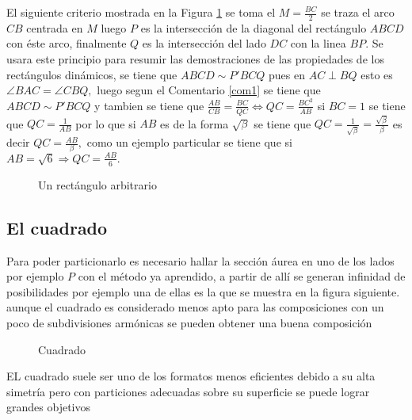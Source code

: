 \begin{comen}

	El siguiente criterio mostrada en la Figura \ref{Upu} se toma el $M=\frac{BC}{2}$ se traza el arco $CB$ centrada en $M$ luego $P$ es la intersección de la diagonal del rectángulo $ABCD$ con éste arco, finalmente $Q$ es la intersección del lado $DC$ con la linea $BP$. Se usara este principio para resumir las demostraciones de las propiedades de los rectángulos dinámicos, se tiene que $ABCD\sim P'BCQ$ pues en $AC\perp BQ$ esto es $\angle{BAC}=\angle{CBQ},$
	luego segun el Comentario \ref{com1} se tiene que $ABCD\sim P'BCQ$ y tambien se tiene que $\frac{AB}{CB}=\frac{BC}{QC}\Longleftrightarrow QC=\frac{BC^2}{AB}$ si $BC=1$ se tiene que $QC=\frac{1}{AB}$ por lo que si $AB$ es de la forma $\sqrt{\beta}$ se tiene que $QC=\frac{1}{\sqrt{\beta}}=\frac{\sqrt{\beta}}{\beta}$ es decir $QC=\frac{AB}{\beta},$ como un ejemplo particular se tiene que si $AB=\sqrt{6}\Longrightarrow QC=\frac{AB}{6}.$

	\begin{figure}[!ht]
		\begin{center}

		\end{center}
		\caption{Un rectángulo arbitrario}\label{Upu}
	\end{figure}

\end{comen}



\subsection{El cuadrado}
Para poder particionarlo es necesario hallar la sección áurea en uno de los lados por ejemplo $P$ con el método ya aprendido, a partir de allí se generan infinidad de posibilidades  por ejemplo una de ellas es la que se muestra en la figura siguiente. aunque el cuadrado es considerado menos apto para las composiciones con un poco de subdivisiones armónicas se pueden obtener una buena composición

\begin{figure}[!ht]
	\begin{center}

	\end{center}
	\caption{Cuadrado}\label{Uk}
\end{figure}

EL cuadrado suele ser uno de los formatos menos eficientes debido a su alta simetría pero con particiones adecuadas sobre su superficie se puede lograr grandes objetivos


